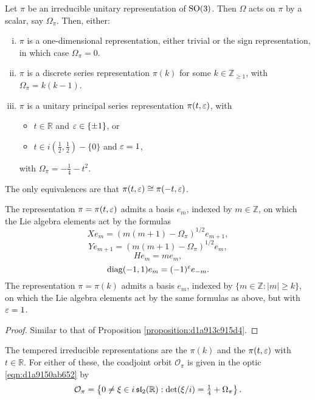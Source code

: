 \documentclass[reqno]{amsart} 
\numberwithin{equation}{section}
\numberwithin{theorem}{section}
\begin{document}
\begin{proposition}
  Let $\pi$ be an irreducible unitary representation of $\operatorname{SO}(3)$.  Then $\Omega$ acts on $\pi$ by a scalar, say $\Omega_\pi$.  Then, either:
  \begin{enumerate}[(i)]
  \item $\pi$ is a one-dimensional representation, either trivial or the sign representation, in which case $\Omega_\pi = 0$.
  \item  $\pi$ is a discrete series representation $\pi(k)$ for some $k \in \mathbb{Z}_{\geq 1}$, with $\Omega_\pi = k(k-1)$.
  \item $\pi$ is a unitary principal series representation $\pi(t,\varepsilon)$, with
    \begin{itemize}
    \item$t \in \mathbb{R}$ and $\varepsilon \in \{\pm 1\}$, or
    \item $t \in i (\tfrac{1}{2}, \tfrac{1}{2} ) - \{0\}$ and $\varepsilon = 1$, 
    \end{itemize}
    with $\Omega_\pi = - \tfrac{1}{4} - t^2$.
  \end{enumerate}
  The only equivalences are that $\pi(t,\varepsilon) \cong \pi(-t,\varepsilon)$.

  The representation $\pi = \pi(t,\varepsilon)$ admits a basis $e_m$, indexed by $m \in \mathbb{Z}$, on which the Lie algebra elements act by the formulas
  \begin{equation*}
    X e_m = ( m(m+1) - \Omega_\pi)^{1/2} e_{m+1},
  \end{equation*}
  \begin{equation*}
    Y e_{m+1} = (m(m+1) - \Omega_\pi)^{1/2} e_{m},
  \end{equation*}
  \begin{equation*}
    H e_m = m e_m,
\end{equation*}
\begin{equation*}
    \operatorname{diag}(-1,1) e_m = (-1)^{\varepsilon} e_{-m}.
  \end{equation*}
  The representation $\pi = \pi(k)$ admits a basis $e_m$, indexed by $\{m \in \mathbb{Z} : |m| \geq k\}$, on which the Lie algebra elements act by the same formulas as above, but with $\varepsilon = 1$.  
\end{proposition}
\begin{proof}
Similar to that of Proposition \ref{proposition:d1a913c915d4}.
\end{proof}

The tempered irreducible representations are the $\pi(k)$ and the $\pi(t,\varepsilon)$ with $t \in \mathbb{R}$.  For either of these, the coadjoint orbit $\mathcal{O}_\pi$ is given in the optic \eqref{eqn:d1a9150ab652} by
\begin{equation}\label{eqn:d1a91628a316}
  \mathcal{O}_\pi = \left\{ 0 \neq \xi \in i \operatorname{\mathfrak{s}\mathfrak{l}}_2(\mathbb{R}) :
    \det(\xi/i) =   
\tfrac{1}{4} + \Omega_\pi     
  \right\}.
\end{equation}
\end{document}
